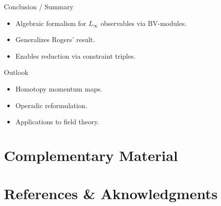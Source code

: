 \documentclass[handout,10pt]{beamer}
\begin{document}
\begin{frame}{Conclusion / Summary}
\begin{itemize}
  \item Algebraic formalism for $L_\infty$ observables via BV-modules.
  \item Generalizes Rogers' result.
  \item Enables reduction via constraint triples.
\end{itemize}
\end{frame}

\begin{frame}{Outlook}
\begin{itemize}
  \item Homotopy momentum maps.
  \item Operadic reformulation.
  \item Applications to field theory.
\end{itemize}
\end{frame}



\appendix
\section{Complementary Material}
	

\section{References \& Aknowledgments}
\end{document}
